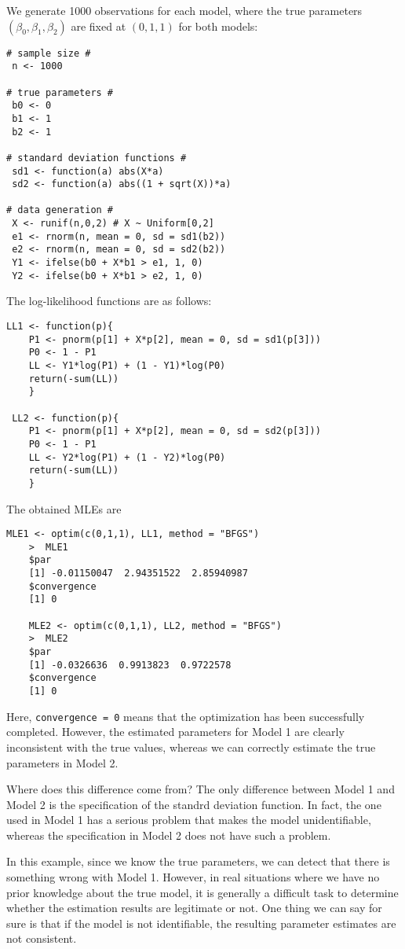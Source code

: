 \documentclass[11pt, A4paper, openany, uplatex]{book}
\begin{document}
We generate 1000 observations for each model, where the true parameters $(\beta_0,\beta_1,\beta_2)$ are fixed at $(0,1,1)$ for both models:
\begin{lstlisting}[basicstyle=\ttfamily\footnotesize, frame=single]
# sample size #
 n <- 1000

# true parameters #
 b0 <- 0
 b1 <- 1
 b2 <- 1

# standard deviation functions #
 sd1 <- function(a) abs(X*a)
 sd2 <- function(a) abs((1 + sqrt(X))*a)

# data generation #
 X <- runif(n,0,2) # X ~ Uniform[0,2]
 e1 <- rnorm(n, mean = 0, sd = sd1(b2))
 e2 <- rnorm(n, mean = 0, sd = sd2(b2))
 Y1 <- ifelse(b0 + X*b1 > e1, 1, 0)
 Y2 <- ifelse(b0 + X*b1 > e2, 1, 0)
\end{lstlisting}
The log-likelihood functions are as follows:
\begin{lstlisting}[basicstyle=\ttfamily\footnotesize, frame=single]
 LL1 <- function(p){
	P1 <- pnorm(p[1] + X*p[2], mean = 0, sd = sd1(p[3]))
	P0 <- 1 - P1
	LL <- Y1*log(P1) + (1 - Y1)*log(P0)
	return(-sum(LL))
	}

 LL2 <- function(p){
	P1 <- pnorm(p[1] + X*p[2], mean = 0, sd = sd2(p[3]))
	P0 <- 1 - P1
	LL <- Y2*log(P1) + (1 - Y2)*log(P0)
	return(-sum(LL))
	}
\end{lstlisting}
The obtained MLEs are
\begin{lstlisting}[basicstyle=\ttfamily\footnotesize, frame=single]
	MLE1 <- optim(c(0,1,1), LL1, method = "BFGS")
	>  MLE1
	$par
	[1] -0.01150047  2.94351522  2.85940987
	$convergence
	[1] 0 

	MLE2 <- optim(c(0,1,1), LL2, method = "BFGS")
	>  MLE2
	$par
	[1] -0.0326636  0.9913823  0.9722578
	$convergence
	[1] 0
\end{lstlisting}
Here, \texttt{convergence = 0} means that the optimization has been successfully completed.
However, the estimated parameters for Model 1 are clearly inconsistent with the true values, whereas we can correctly estimate the true parameters in Model 2.

Where does this difference come from?
The only difference between Model 1 and Model 2 is the specification of the standrd deviation function.
In fact, the one used in Model 1 has a serious problem that makes the model unidentifiable, whereas the specification in Model 2 does not have such a problem.

In this example, since we know the true parameters, we can detect that there is something wrong with Model 1.
However, in real situations where we have no prior knowledge about the true model, it is generally a difficult task to determine whether the estimation results are legitimate or not.
One thing we can say for sure is that if the model is not identifiable, the resulting parameter estimates are not consistent.
\end{document}
